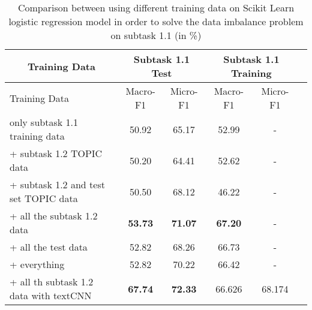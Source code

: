 \begin{table}[htbp!] %
    \begin{tabular}{lccccc}
    \toprule
        \multicolumn{1}{c}{Training Data}            & \multicolumn{2}{c}{Subtask 1.1 Test}  & \multicolumn{2}{c}{Subtask 1.1 Training} \\
    \midrule
        Training Data                                & Macro-F1         & Micro-F1           & Macro-F1         & Micro-F1       \\
    \midrule
        only subtask 1.1 training data               & 50.92            & 65.17              & 52.99            & -              \\
        + subtask 1.2 TOPIC data                     & 50.20            & 64.41              & 52.62            & -              \\
        + subtask 1.2 and test set TOPIC data        & 50.50            & 68.12              & 46.22            & -              \\
        + all the subtask 1.2 data                   & \bf53.73         & \bf71.07           & \bf67.20         & -              \\
        + all the test data                          & 52.82            & 68.26              & 66.73            & -              \\
        + everything                                 & 52.82            & 70.22              & 66.42            & -              \\
        + all th subtask 1.2 data with textCNN       & \bf67.74         & \bf72.33           & 66.626           & 68.174         \\
    \bottomrule
    \end{tabular}
\caption{Comparison between using different training data on Scikit Learn logistic regression model in order to solve the data imbalance problem on subtask 1.1 (in \%)}
\label{tab:data_imbalance}
\end{table}
